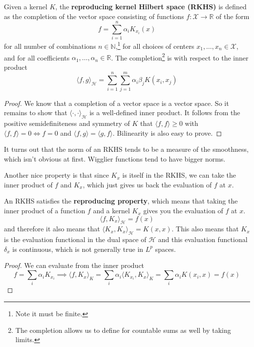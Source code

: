   \begin{definition}
    Given a kernel $K$, the \textbf{reproducing kernel Hilbert space (RKHS)} is defined as the completion of the vector space consisting of functions $f: \mathcal{X} \to \mathbb{R}$ of the form
    \begin{equation}
      f = \sum_{i=1}^n \alpha_i K_{x_i} (x) 
    \end{equation}
    for all number of combinations $n \in \mathbb{N}$,\footnote{Note it must be finite.} for all choices of centers $x_1, \ldots, x_n \in \mathcal{X}$, and for all coefficients $\alpha_1, \ldots, \alpha_n \in \mathbb{R}$. The completion\footnote{The completion allows us to define for countable sums as well by taking limits.} is with respect to the inner product 
    \begin{equation}
      \langle f, g \rangle_{\mathcal{H}} = \sum_{i=1}^n \sum_{j=1}^m \alpha_i \beta_j K(x_i, x_j)
    \end{equation}
  \end{definition}
  \begin{proof}
    We know that a completion of a vector space is a vector space. So it remains to show that $\langle \cdot, \cdot \rangle_{\mathcal{H}}$ is a well-defined inner product. It follows from the positive semidefiniteness and symmetry of $K$ that $\langle f, f \rangle \geq 0$ with $\langle f, f \rangle = 0 \iff f = 0$ and $\langle f, g \rangle = \langle g, f \rangle$. Bilinearity is also easy to prove. 
  \end{proof}

  It turns out that the norm of an RKHS tends to be a measure of the smoothness, which isn't obvious at first. Wigglier functions tend to have bigger norms. 

  Another nice property is that since $K_x$ is itself in the RKHS, we can take the inner product of $f$ and $K_x$, which just gives us back the evaluation of $f$ at $x$. 

  \begin{theorem}
    An RKHS satisfies the \textbf{reproducing property}, which means that taking the inner product of a function $f$ and a kernel $K_x$ gives you the evaluation of $f$ at $x$. 
    \begin{equation}
      \langle f, K_x \rangle_{\mathcal{H}} = f(x)
    \end{equation}
    and therefore it also means that $\langle K_x, K_x \rangle_{\mathcal{H}} = K(x, x)$. This also means that $K_x$ is the evaluation functional in the dual space of $\mathcal{H}$ and this evaluation functional $\delta_x$ is continuous, which is not generally true in $L^p$ spaces. 
  \end{theorem}
  \begin{proof}
    We can evaluate from the inner product 
    \begin{equation}
      f = \sum_i \alpha_i K_{x_i} \implies \langle f, K_x \rangle_K = \sum_i \alpha_i \langle K_{x_i}, K_x \rangle_K = \sum_i \alpha_i K(x_i, x) = f(x)
    \end{equation}
  \end{proof}

